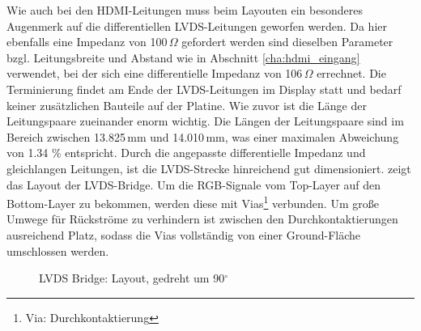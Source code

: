 Wie auch bei den HDMI-Leitungen muss beim Layouten ein besonderes Augenmerk auf die differentiellen LVDS-Leitungen geworfen werden. Da hier ebenfalls eine Impedanz von 100\,$\Omega$ gefordert werden sind dieselben Parameter bzgl. Leitungsbreite und Abstand wie in Abschnitt \ref{cha:hdmi_eingang} verwendet, bei der sich eine differentielle Impedanz von 106\,$\Omega$ errechnet.  Die Terminierung findet am Ende der LVDS-Leitungen im Display statt und bedarf keiner zusätzlichen Bauteile auf der Platine. Wie zuvor ist die Länge der Leitungspaare zueinander enorm wichtig. Die Längen der Leitungspaare sind im Bereich zwischen 13.825\,mm und 14.010\,mm, was einer maximalen Abweichung von 1.34 \% entspricht. Durch die angepasste differentielle Impedanz und gleichlangen Leitungen, ist die LVDS-Strecke hinreichend gut dimensioniert.  zeigt das Layout der LVDS-Bridge. Um die RGB-Signale vom Top-Layer auf den Bottom-Layer zu bekommen, werden diese mit Vias\footnote{Via: Durchkontaktierung} verbunden. Um große Umwege für Rückströme zu verhindern ist zwischen den Durchkontaktierungen ausreichend Platz, sodass die Vias vollständig von einer Ground-Fläche umschlossen werden.
\begin{figure}[htp]
		\center
        \caption{LVDS Bridge: Layout, gedreht um 90$^{\circ}$}
       \label{fig:teilb_lvds_bridge_pcb}
\end{figure}
\newpage
